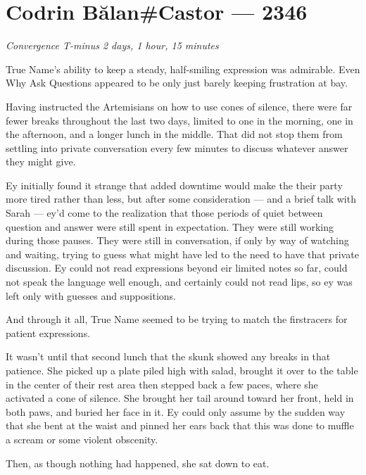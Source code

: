 \hypertarget{codrin-bux103lancastor-2346}{%
\chapter{Codrin Bălan\#Castor — 2346}\label{codrin-bux103lancastor-2346}}

\begin{center}
\emph{Convergence T-minus 2 days, 1 hour, 15 minutes}
\end{center}

\noindent True Name's ability to keep a steady, half-smiling expression was admirable. Even Why Ask Questions appeared to be only just barely keeping frustration at bay.

Having instructed the Artemisians on how to use cones of silence, there were far fewer breaks throughout the last two days, limited to one in the morning, one in the afternoon, and a longer lunch in the middle. That did not stop them from settling into private conversation every few minutes to discuss whatever answer they might give.

Ey initially found it strange that added downtime would make the their party more tired rather than less, but after some consideration — and a brief talk with Sarah — ey'd come to the realization that those periods of quiet between question and answer were still spent in expectation. They were still working during those pauses. They were still in conversation, if only by way of watching and waiting, trying to guess what might have led to the need to have that private discussion. Ey could not read expressions beyond eir limited notes so far, could not speak the language well enough, and certainly could not read lips, so ey was left only with guesses and suppositions.

And through it all, True Name seemed to be trying to match the firstracers for patient expressions.

It wasn't until that second lunch that the skunk showed any breaks in that patience. She picked up a plate piled high with salad, brought it over to the table in the center of their rest area then stepped back a few paces, where she activated a cone of silence. She brought her tail around toward her front, held in both paws, and buried her face in it. Ey could only assume by the sudden way that she bent at the waist and pinned her ears back that this was done to muffle a scream or some violent obscenity.

Then, as though nothing had happened, she sat down to eat.

